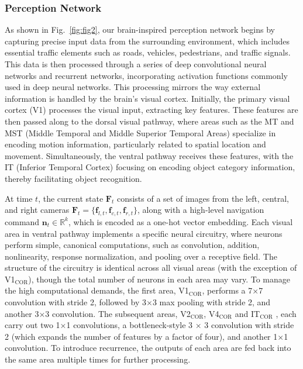 \subsubsection{Perception Network}
\hspace{1pc}As shown in Fig.~\ref{fig:fig2}, our brain-inspired perception network begins by capturing precise input data from the surrounding environment, which includes essential traffic elements such as roads, vehicles, pedestrians, and traffic signals. 
This data is then processed through a series of deep convolutional neural networks and recurrent networks, incorporating activation functions commonly used in deep neural networks. 
This processing mirrors the way external information is handled by the brain's visual cortex. 
Initially, the primary visual cortex (V1) processes the visual input, extracting key features. 
These features are then passed along to the dorsal visual pathway, where areas such as the MT and MST (Middle Temporal and Middle Superior Temporal Areas) specialize in encoding motion information, particularly related to spatial location and movement. 
Simultaneously, the ventral pathway receives these features, with the IT (Inferior Temporal Cortex) focusing on encoding object category information, thereby facilitating object recognition.


At time $t$, the current state $\mathbf{F}_t$ consists of a set of images from the left, central, and right cameras $\mathbf{F}_{t}=\{\mathbf{f}_{l,t}, \mathbf{f}_{c,t}, \mathbf{f}_{r,t} \}$, along with a high-level navigation command $\mathbf{n}_t\in\mathbb{R}^{k}$, which is encoded as a one-hot vector embedding.
%
Each visual area in ventral pathway implements a specific neural circuitry, where neurons perform simple, canonical computations, such as convolution, addition, nonlinearity, response normalization, and pooling over a receptive field. 
The structure of the circuitry is identical across all visual areas (with the exception of V1$_\text{COR}$), though the total number of neurons in each area may vary.
To manage the high computational demands, the first area, V1$_\text{COR}$, performs a 7$\times$7 convolution with stride 2, followed by 3$\times$3 max pooling with stride 2, and another 3$\times$3 convolution. 
The subsequent areas, V2$_\text{COR}$, V4$_\text{COR}$ and IT$_\text{COR}$ , each carry out two 1$\times$1 convolutions, a bottleneck-style 3 $ \times $ 3 convolution with stride 2 (which expands the number of features by a factor of four), and another 1$\times$1 convolution. 
To introduce recurrence, the outputs of each area are fed back into the same area multiple times for further processing.


